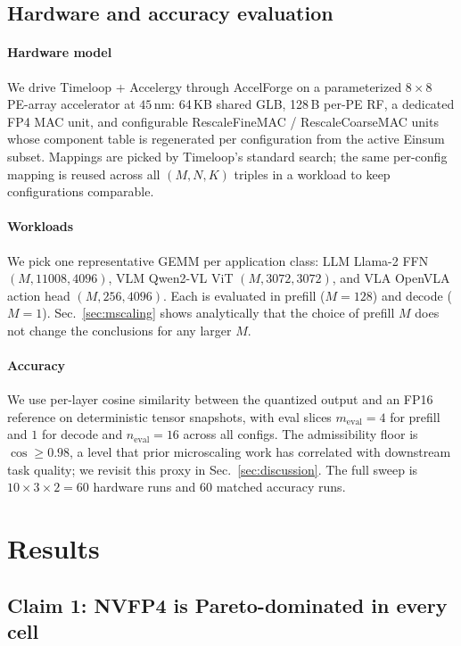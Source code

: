 \documentclass[conference]{IEEEtran}
\begin{document}
\subsection{Hardware and accuracy evaluation}

\paragraph*{Hardware model}
We drive Timeloop \cite{timeloop} + Accelergy \cite{accelergy}
through AccelForge on a parameterized $8\!\times\!8$ PE-array
accelerator at $45$\,nm: 64\,KB shared GLB, 128\,B per-PE RF, a
dedicated FP4 MAC unit, and configurable RescaleFineMAC /
RescaleCoarseMAC units whose component table is regenerated per
configuration from the active Einsum subset.  Mappings are picked
by Timeloop's standard search; the same per-config mapping is
reused across all $(M,N,K)$ triples in a workload to keep
configurations comparable.

\paragraph*{Workloads}
We pick one representative GEMM per application class:
LLM Llama-2 FFN $(M,11008,4096)$, VLM Qwen2-VL ViT
$(M,3072,3072)$, and VLA OpenVLA action head $(M,256,4096)$.
Each is evaluated in prefill ($M{=}128$) and decode ($M{=}1$).
Sec.~\ref{sec:mscaling} shows analytically that the choice of
prefill $M$ does not change the conclusions for any larger $M$.

\paragraph*{Accuracy}
We use per-layer cosine similarity between the quantized output
and an FP16 reference on deterministic tensor snapshots, with
eval slices $m_{\mathrm{eval}}{=}4$ for prefill and $1$ for
decode and $n_{\mathrm{eval}}{=}16$ across all configs.  The
admissibility floor is $\cos\!\geq\!0.98$, a level that prior
microscaling work \cite{microscaling-eval, isfiner} has
correlated with downstream task quality; we revisit this proxy
in Sec.~\ref{sec:discussion}.  The full sweep is
$10\!\times\!3\!\times\!2\!=\!60$ hardware runs and $60$ matched
accuracy runs.

\section{Results}
\label{sec:results}

\subsection{Claim 1: NVFP4 is Pareto-dominated in every cell}
\label{sec:claim-nvfp4}
\end{document}
